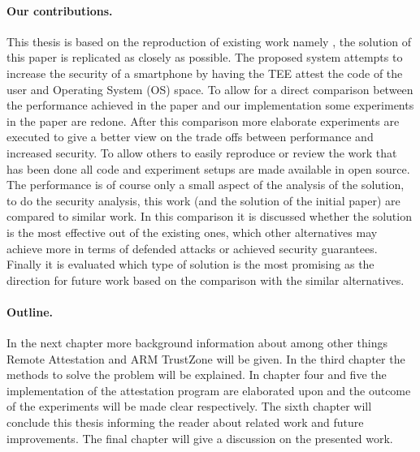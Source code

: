 \paragraph*{Our contributions.}
This thesis is based on the reproduction of existing work namely \cite{LingZhen2021Sbtb}, the solution of this paper is replicated as closely as possible. The proposed system attempts to increase the security of a smartphone by having the TEE attest the code of the user and Operating System (OS) space. To allow for a direct comparison between the performance achieved in the paper and our implementation some experiments in the paper are redone. After this comparison more elaborate experiments are executed to give a better view on the trade offs between performance and increased security. To allow others to easily reproduce or review the work that has been done all code and experiment setups are made available in open source. The performance is of course only a small aspect of the analysis of the solution, to do the security analysis, this work (and the solution of the initial paper) are compared to similar work. In this comparison it is discussed whether the solution is the most effective out of the existing ones, which other alternatives may achieve more in terms of defended attacks or achieved security guarantees. Finally it is evaluated which type of solution is the most promising as the direction for future work based on the comparison with the similar alternatives.

\paragraph*{Outline.}
In the next chapter more background information about among other things Remote Attestation and ARM TrustZone will be given. In the third chapter the methods to solve the problem will be explained. In chapter four and five the implementation of the attestation program are elaborated upon and the outcome of the experiments will be made clear respectively. The sixth chapter will conclude this thesis informing the reader about related work and future improvements. The final chapter will give a discussion on the presented work.
